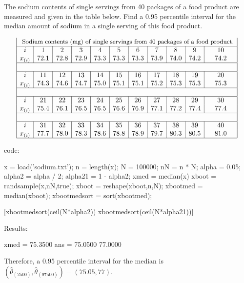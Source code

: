 \begin{labwork}
 The sodium contents of single servings from 40 packages of a food product are measured and given in the table below. Find a 0.95 percentile interval for the median amount of sodium in a single serving of this food product.
\begin{table}
$$\begin{array}{|c|c|c|c|c|c|c|c|c|c|c|}
\multicolumn{11}{|c|}{\textrm{ \small{Sodium contents (mg) of single servings from 40 packages of a food product.}}}\\
\hline
i	&1&	2	&3&	4	&5&	6&	7&	8&	9&	10\\
x_{(i)}	&72.1&	72.8	&72.9	&73.3&	73.3	&73.3&	73.9	&74.0	&74.2&74.2\\
\hline
\multicolumn{11}{|c|}{ \textrm{ }}\\\hline
i	&11	&12	&13	&14	&15	&16	&17	&18	&19	&20\\
x_{(i)}	&	74.3	&74.6	&74.7	&75.0	&75.1	&75.1	&75.2	&75.3	&75.3	&75.3\\\hline
\multicolumn{11}{|c|}{ \textrm{ }}\\\hline
i	&21	&22	&23	&24	&25	&26	&27&28	&29	&30\\
x_{(i)}		&75.4&	76.1	&76.5	&76.5	&76.6	&76.9&	77.1	&77.2&	77.4&77.4\\\hline
\multicolumn{11}{|c|}{\textrm{ } }\\\hline
i	&31	&32	&33	&34	&35	&36	&37	&38	&39	&40\\
x_{(i)}		&77.7&	78.0	&78.3&	78.6	&78.8	&78.9	&79.7	&80.3&	80.5	&81.0\\\hline
\end{array}$$
\end{table}

\Matlab code:
\begin{VrbM}
x = load('sodium.txt'); %
n = length(x); %
N = 100000; %
nN = n * N;
alpha = 0.05;
alpha2 = alpha / 2;
alpha21 = 1 - alpha2;
xmed = median(x) %
xboot = randsample(x,nN,true); %
xboot = reshape(xboot,n,N); %
xbootmed = median(xboot); %
xbootmedsort = sort(xbootmed); %

[xbootmedsort(ceil(N*alpha2)) xbootmedsort(ceil(N*alpha21))] 
\end{VrbM}
Results:
\begin{VrbM}
xmed = 75.3500
ans =  75.0500   77.0000
\end{VrbM}
Therefore, a 0.95 percentile interval for the median is $(\hat{\theta}_{(2500)},\hat{\theta}_{(97500)})= (75.05, 77)$.

\end{labwork}

